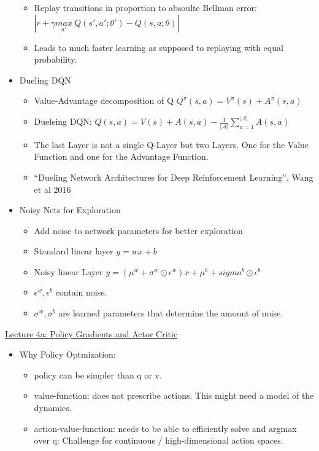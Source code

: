 \begin{itemize}[noitemsep,nolistsep]
	\begin{itemize}[noitemsep,nolistsep]
		\item Replay transitions in proportion to absoulte Bellman error: $|r + \gamma \underset{a'}{max}\ Q(s',a';\theta') - Q(s,a;\theta)|$
		\item Leads to much faster learning as supposed to replaying with equal probability.
	\end{itemize}
	\item Dueling DQN
	\begin{itemize}[noitemsep,nolistsep]
		\item Value-Advantage decomposition of Q $Q^\pi(s,a) = V^\pi(s) + A^\pi(s,a)$
		\item Dueleing DQN: $Q(s,a) = V(s) + A(s,a) - \frac{1}{|\mathcal{A}|} \sum_{a=1}^{|\mathcal{A}|} A(s,a)$
		\item The last Layer is not a single Q-Layer but two Layers. One for the Value Function and one for the Advantage Function.
		\item “Dueling Network Architectures for Deep Reinforcement Learning”, Wang et al 2016
	\end{itemize}
	\item Noisy Nets for Exploration
	\begin{itemize}[noitemsep,nolistsep]
		\item Add noise to network parameters for better exploration
		\item Standard linear layer $y = wx + b$
		\item Noisy linear Layer $y = (\mu^w + \sigma^w \odot \epsilon^w)x + \mu^b + sigma^b \odot \epsilon^b$
		\item $\epsilon^w, \epsilon^b$ contain noise.
		\item $\sigma^w, \sigma^b$ are learned parameters that determine the amount of noise.
	\end{itemize}
\end{itemize}
\href{https://www.youtube.com/watch?v=qaMdN6LS9rA}{Lecture 4a: Policy Gradients and Actor Critic}\\
\begin{itemize}[noitemsep,nolistsep]
	\item Why Policy Optmization:
	\begin{itemize}[noitemsep,nolistsep]
		\item policy can be simpler than q or v.
		\item value-function: does not prescribe actions. This might need a model of the dynamics.
		\item action-value-function: needs to be able to efficiently solve and argmax over q: Challenge for continuous / high-dimensional action spaces.
	\end{itemize}
\end{itemize}
